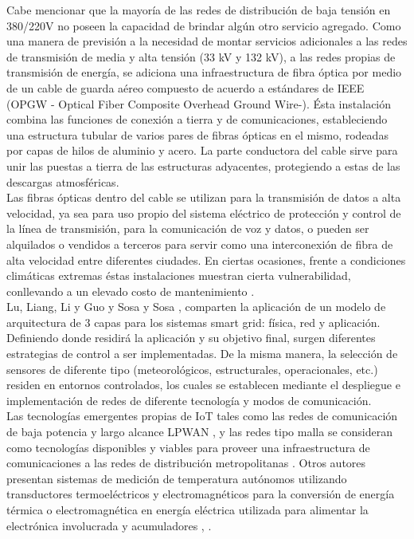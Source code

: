 Cabe mencionar que la mayoría de las redes de distribución de baja tensión en 380/220V no poseen la capacidad de brindar algún otro servicio agregado. Como una manera de previsión a la necesidad de montar servicios adicionales a las redes de transmisión de media y alta tensión (33 kV y 132 kV), a las redes propias de transmisión de energía, se adiciona una infraestructura de fibra óptica por medio de un cable de guarda aéreo compuesto de acuerdo a estándares de IEEE (OPGW - Optical Fiber Composite Overhead Ground Wire-). Ésta instalación combina las funciones de conexión a tierra y de comunicaciones, estableciendo una estructura tubular de varios pares de fibras ópticas en el mismo, rodeadas por capas de hilos de aluminio y acero. La parte conductora del cable sirve para unir las puestas a tierra de las estructuras adyacentes, protegiendo a estas de las descargas atmosféricas.\\
Las fibras ópticas dentro del cable se utilizan para la transmisión de datos a alta velocidad, ya sea para uso propio del sistema eléctrico de protección y control de la línea de transmisión, para la comunicación de voz y datos, o pueden ser alquilados o vendidos a terceros para servir como una interconexión de fibra de alta velocidad entre diferentes ciudades. En ciertas ocasiones, frente a condiciones climáticas extremas éstas instalaciones muestran cierta vulnerabilidad, conllevando a un elevado costo de mantenimiento \citep{ARTICLE:1}.\\
Lu, Liang, Li y Guo \citep{ARTICLE:1} y Sosa y Sosa \citep{ARTICLE:2}, comparten la aplicación de un modelo de arquitectura de 3 capas para los sistemas smart grid: física, red y aplicación. Definiendo donde residirá la aplicación y su objetivo final, surgen diferentes estrategias de control a ser implementadas. De la misma manera, la selección de sensores de diferente tipo (meteorológicos, estructurales, operacionales, etc.) residen en entornos controlados, los cuales se establecen mediante el despliegue e implementación de redes de diferente tecnología y modos de comunicación.\\
Las tecnologías emergentes propias de IoT tales como las redes de comunicación de baja potencia y largo alcance LPWAN \citep{rfc8376}, y las redes tipo malla se consideran como tecnologías disponibles y viables para proveer una infraestructura de comunicaciones a las redes de distribución metropolitanas  \citep{ARTICLE:4}. Otros autores presentan sistemas de medición de temperatura autónomos utilizando transductores termoeléctricos y electromagnéticos para la conversión de energía térmica o electromagnética en energía eléctrica utilizada para alimentar la electrónica involucrada y acumuladores \citep{ARTICLE:5}, \citep{Hua}.

